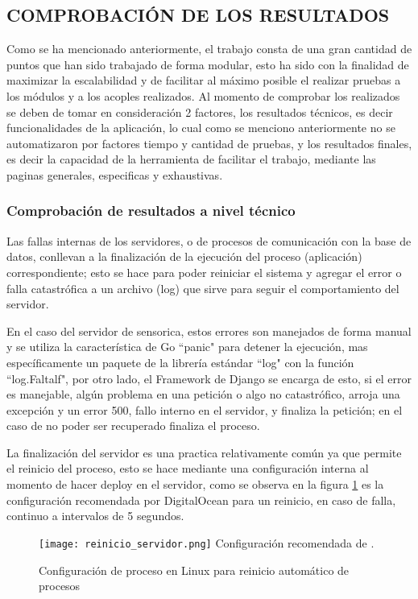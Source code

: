 
\subsection{COMPROBACIÓN DE LOS RESULTADOS}

Como se ha mencionado anteriormente, el trabajo consta de una gran cantidad de
puntos que han sido trabajado de forma modular, esto ha sido con la finalidad
de maximizar la escalabilidad y de facilitar al máximo posible el realizar pruebas
a los módulos y a los acoples realizados. Al momento de comprobar los realizados
se deben de tomar en consideración 2 factores, los resultados técnicos, es decir
funcionalidades de la aplicación, lo cual como se menciono anteriormente no se
automatizaron por factores tiempo y cantidad de pruebas, y los resultados finales,
es decir la capacidad de la herramienta de facilitar el trabajo, mediante
las paginas generales, especificas y exhaustivas.

\subsubsection{Comprobación de resultados a nivel técnico}

Las fallas internas de los servidores, o de procesos de comunicación
con la base de datos, conllevan a la finalización de la ejecución del proceso
(aplicación) correspondiente; esto se hace para poder reiniciar el sistema y
agregar el error o falla catastrófica a un archivo (log) que sirve para seguir el
comportamiento del servidor.

En el caso del servidor de sensorica, estos errores son manejados de forma manual
y se utiliza la característica de Go ``panic" para detener la ejecución, mas
específicamente un paquete de la librería estándar ``log" con la función ``log.Faltalf",
por otro lado, el Framework de Django se encarga de esto, si el error es manejable,
algún problema en una petición o algo no catastrófico, arroja una excepción y un
error 500, fallo interno en el servidor, y finaliza la petición; en el caso de no
poder ser recuperado finaliza el proceso.

La finalización del servidor es una practica relativamente común ya que permite
el reinicio del proceso, esto se hace mediante una configuración interna al
momento de hacer deploy en el servidor, como se observa en la figura \ref{ProcesosLinux}
es la configuración recomendada por DigitalOcean para un reinicio, en caso de falla,
continuo a intervalos de 5 segundos.

	\begin{figure}[htb]
		\centering
        \caption{Configuración de proceso en Linux para reinicio automático de procesos}
        \texttt{[image: reinicio\_servidor.png]}
        Configuración recomendada de \Cite{ConfiguracionProcesos}.
        \label{ProcesosLinux}
	\end{figure}

